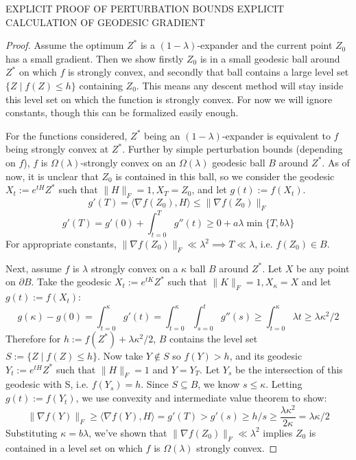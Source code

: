\documentclass{article}
\begin{document}
EXPLICIT PROOF OF PERTURBATION BOUNDS
EXPLICIT CALCULATION OF GEODESIC GRADIENT



\begin{proof}
Assume the optimum $Z^{*}$ is a $(1-\lambda)$-expander and the current point $Z_{0}$ has a small gradient. Then we show firstly $Z_{0}$ is in a small geodesic ball around $Z^{*}$ on which $f$ is strongly convex, and secondly that ball contains a large level set $\{Z \mid f(Z) \leq h \}$ containing $Z_{0}$. This means any descent method will stay inside this level set on which the function is strongly convex. For now we will ignore constants, though this can be formalized easily enough. 

For the functions considered, $Z^{*}$ being an $(1-\lambda)$-expander is equivalent to $f$ being strongly convex at $Z^{*}$. Further by simple perturbation bounds (depending on $f$), $f$ is $\Omega(\lambda)$-strongly convex on an $\Omega(\lambda)$ geodesic ball $B$ around $Z^{*}$. As of now, it is unclear that $Z_{0}$ is contained in this ball, so we consider the geodesic $X_{t} := e^{tH} Z^{*}$ such that $\|H\|_{F} = 1, X_{T} = Z_{0}$, and let $g(t) := f(X_{t})$. 
\[ g'(T) = \langle \nabla f(Z_{0}), H \rangle \leq \|\nabla f(Z_{0})\|_{F}   \]
\[ g'(T) = g'(0) + \int_{t=0}^{T} g''(t) \geq 0 + a \lambda \min\{T, b \lambda\}  \]
For appropriate constants, $\|\nabla f(Z_{0})\|_{F} \ll \lambda^{2} \implies T \ll \lambda$, i.e. $f(Z_{0}) \in B$. 


Next, assume $f$ is $\lambda$ strongly convex on a $\kappa$ ball $B$ around $Z^{*}$. Let $X$ be any point on $\partial B$. Take the geodesic $X_{t} := e^{tK} Z^{*}$ such that $\|K\|_{F}=1, X_{\kappa} = X$ and let $g(t) := f(X_{t})$:
\[ g(\kappa) - g(0) = \int_{t=0}^{\kappa} g'(t) = \int_{t=0}^{\kappa} \int_{s=0}^{t} g''(s) \geq \int_{t=0}^{\kappa} \lambda t \geq \lambda \kappa^{2}/2 \]
Therefore for $h := f(Z^{*}) + \lambda \kappa^{2}/2$, $B$ contains the level set $S := \{Z \mid f(Z) \leq h \}$. Now take $Y \not\in S$ so $f(Y) > h$, and its geodesic $Y_{t} := e^{tH} Z^{*}$ such that $\|H\|_{F}=1$ and $Y = Y_{T}$. Let $Y_{s}$ be the intersection of this geodesic with S, i.e. $f(Y_{s}) = h$. Since $S \subseteq B$, we know $s \leq \kappa$. Letting $g(t) := f(Y_{t})$, we use convexity and intermediate value theorem to show:
\[ \|\nabla f(Y)\|_{F} \geq \langle \nabla f(Y), H \rangle = g'(T) > g'(s) \geq h / s \geq  \frac{\lambda \kappa^{2}}{2 \kappa} = \lambda \kappa / 2  \]
Substituting $\kappa = b\lambda$, we've shown that $\|\nabla f(Z_{0})\|_{F} \ll \lambda^{2}$ implies $Z_{0}$ is contained in a level set on which $f$ is $\Omega(\lambda)$ strongly convex. 


\end{proof}
\end{document}
